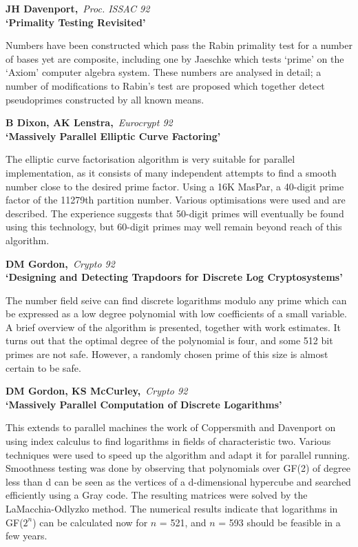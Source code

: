 {\bf \noindent JH Davenport,}{\em ~Proc. ISSAC 92\\}
{\bf `Primality Testing Revisited'}

Numbers have been constructed which pass the Rabin primality test for a
number of bases yet are composite, including one by Jaeschke which tests
`prime' on the `Axiom' computer algebra system. These numbers are analysed 
in detail; a number of modifications to Rabin's test are proposed which 
together detect pseudoprimes constructed by all known means.

{\bf \noindent B Dixon, AK Lenstra,}{\em ~Eurocrypt 92\\}
{\bf `Massively Parallel Elliptic Curve Factoring'}

The elliptic curve factorisation algorithm is very suitable for parallel 
implementation, as it consists of many independent attempts to find a
smooth number close to the desired prime factor. Using a 16K MasPar, a
40-digit prime factor of the 11279th partition number. Various optimisations
were used and are described. The experience suggests that 50-digit primes 
will eventually be found using this technology, but 60-digit primes may well 
remain beyond reach of this algorithm.

{\bf \noindent DM Gordon,}{\em ~Crypto 92\\}
{\bf `Designing and Detecting Trapdoors for Discrete Log Cryptosystems'}

The number field seive can find discrete logarithms modulo any prime which 
can be expressed as a low degree polynomial with low coefficients of a small 
variable. A brief overview of the algorithm is presented, together with work 
estimates. It turns out that the optimal degree of the polynomial is four, and 
some 512 bit primes are not safe. However, a randomly chosen prime of this
size is almost certain to be safe.

\pagebreak

{\bf \noindent DM Gordon, KS McCurley,}{\em ~Crypto 92\\}
{\bf `Massively Parallel Computation of Discrete Logarithms'}

This extends to parallel machines the work of Coppersmith and Davenport on 
using index calculus to find logarithms in fields of characteristic two. 
Various techniques were used to speed up the algorithm and adapt it for 
parallel running. Smoothness testing was done by observing that polynomials 
over GF(2) of degree less than d can be seen as the vertices of a d-dimensional
hypercube and searched efficiently using a Gray code. The resulting matrices
were solved by the LaMacchia-Odlyzko method. The numerical results indicate 
that logarithms in GF($2^n$) can be calculated now for $n$ = 521, and $n$ = 593
should be feasible in a few years.

